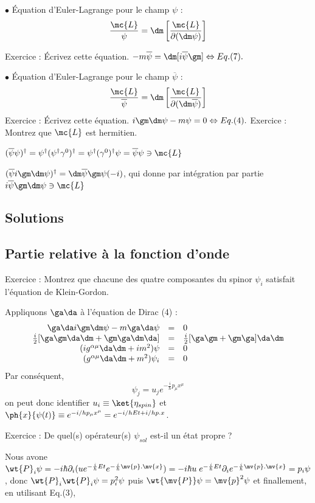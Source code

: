 $\bullet$ Équation d’Euler-Lagrange pour le champ $\psi$ :
\[
\frac{\mc{L}}{\psi}=\dm\left[\frac{\mc{L}}{\partial(\dm\psi)}\right]
\]

Exercice : Écrivez cette équation.
$-m\overline{\psi}=\dm[i\overline{\psi}\gm]\Leftrightarrow Eq.(7).$

$\bullet$ Équation d’Euler-Lagrange pour le champ $\overline{\psi}$ :
\[
\frac{\mc{L}}{\overline{\psi}}=
\dm\left[\frac{\mc{L}}{\partial(\dm\overline{\psi})}\right]
\]
Exercice : Écrivez cette équation.
$i\gm\dm\psi-m\psi=0\Leftrightarrow Eq.(4).$
Exercice : Montrez que $\mc{L}$ est hermitien.

$(\overline{\psi}\psi)^\dagger=
\psi^\dagger(\psi^\dagger\gamma^0)^\dagger=
\psi^\dagger(\gamma^0)^\dagger\psi=
\overline{\psi}\psi\ni\mc{L}$

$(\overline{\psi}i\gm\dm\psi)^\dagger=
\dm\overline{\psi}\gm\psi(-i)$,
qui donne par intégration par partie
$i\overline{\psi}\gm\dm\psi\ni\mc{L}$
\subsection{Solutions}
\subsection{Partie relative à la fonction d'onde}
Exercice : Montrez que chacune des quatre composantes du spinor $\psi_i$ satisfait
l’équation de Klein-Gordon.

Appliquons $\ga\da$ à l’équation de Dirac (4) :
\[\begin{array}{ r c l }
\ga\da i\gm\dm\psi - m\ga\da\psi & = & 0 \\
\frac{i}{2}[\ga\gm\da\dm+\gm\ga\dm\da] & = & \frac{i}{2}[\ga\gm+\gm\ga]\da\dm \\
(ig^{\alpha\mu}\da\dm+im^2)\psi & = & 0 \\
(g^{\alpha\mu}\da\dm+m^2)\psi_i & = & 0 \\
\end{array}\]
Par conséquent,
\[
\psi_j=u_je^{-\frac{i}{\hbar}p_\mu x^\mu}
\]
on peut donc identifier $u_i\equiv\ket{\eta_{spin}}$ et $\ph{x}{\psi(t)}\equiv
e^{-i/h p_\mu x^\mu}=e^{-i/h Et+i/h p.x}$.

Exercice : De quel(s) opérateur(s) $\psi_{sol}$ est-il un état propre ?

Nous avone $\wt{P}_i\psi=
-i\hbar\partial_i(ue^{-\frac{i}{\hbar}Et}e^{-\frac{i}{\hbar}\mv{p}.\mv{x}})=
-i\hbar u\; e^{-\frac{i}{\hbar}Et}\partial_ie^{-\frac{i}{\hbar}\mv{p}.\mv{x}}=
p_i\psi$, donc $\wt{P}_i\wt{P}_i\psi=p_i^2\psi$ puis $\wt{\mv{P}}\psi=\mv{p}^2\psi$
et finallement, en utilisant Eq.(3),

\[
\tag{} \boxed{
} \qquad %
\]


\[
\tag{} \boxed{
} \qquad %
\]



